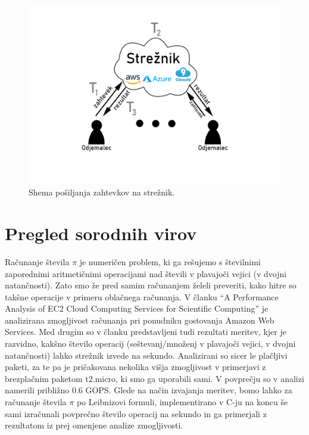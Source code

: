 \begin{figure}[H]
    \centering
    \includegraphics[scale=0.75]{3_shema.png}
    \caption{Shema pošiljanja zahtevkov na strežnik.}
    \label{fig:3_shema_sistema}
\end{figure}



\section{Pregled sorodnih virov}

Računanje števila \(\pi\) je numeričen problem, ki ga rešujemo s številnimi zaporednimi aritmetičnimi operacijami nad števili v plavajoči vejici (v dvojni natančnosti).
Zato smo že pred samim računanjem želeli preveriti, kako hitre so takšne operacije v primeru oblačnega računanja.
V članku ``A Performance Analysis of EC2 Cloud Computing Services for Scientific Computing'' \cite{3_ostermann2009performance} je analizirana zmogljivost računanja pri ponudniku gostovanja Amazon Web Services.
Med drugim so v članku predstavljeni tudi rezultati meritev, kjer je razvidno, kakšno število operacij (seštevanj/množenj v plavajoči vejici, v dvojni natančnosti) lahko strežnik izvede na sekundo.
Analizirani so sicer le plačljivi paketi, za te pa je pričakovana nekolika višja zmogljivost v primerjavi z brezplačnim paketom t2.micro, ki smo ga uporabili sami.
V povprečju so v analizi namerili približno 0.6 GOPS.
Glede na način izvajanja meritev, bomo lahko za računanje števila \(\pi\) po Leibnizovi formuli, implementirano v C-ju na koncu še sami izračunali povprečno število operacij na sekundo in ga primerjali z rezultatom iz prej omenjene analize zmogljivosti.



